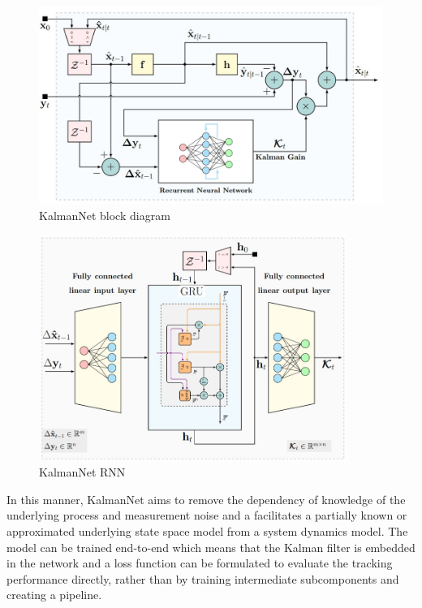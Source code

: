 \documentclass[a4paper,twoside,12pt]{report}
\begin{document}
\begin{figure}[h!]
\begin{center}
\includegraphics[width=12.5cm]{images/kalmannet1.jpg}
\caption{KalmanNet block diagram \citep{kalmannet}}
\label{fig:blockd}
\end{center}
\end{figure}

\begin{figure}[h!]
\begin{center}
\includegraphics[width=10cm]{images/kalmannet2.jpg}
\caption{KalmanNet RNN \citep{kalmannet}}
\label{fig:architecture}
\end{center}
\end{figure}

In this manner, KalmanNet aims to remove the dependency of knowledge of the underlying process and measurement noise and a facilitates a partially known or approximated underlying state space model from a system dynamics model. The model can be trained end-to-end which means that the Kalman filter is embedded in the network and a loss function can be formulated to evaluate the tracking performance directly, rather than by training intermediate subcomponents and creating a pipeline.
\end{document}
